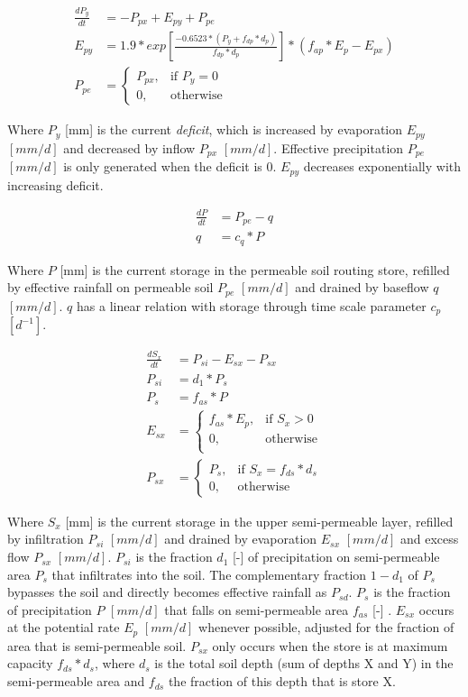 \begin{align}
	\frac{dP_y}{dt} &= -P_{px}+E_{py}+P_{pe} \\
	E_{py} &= 1.9*exp\left[{\frac{-0.6523*(P_y+f_{dp}*d_p)}{f_{dp}*d_p}}\right]*\left(f_{ap}*E_p - E_{px}\right)\\
	P_{pe} &= 
	\begin{cases}
		P_{px}, & \text{if } P_y = 0 \\
		0, & \text{otherwise}
	\end{cases}
\end{align}

Where $P_y$ [mm] is the current \emph{deficit}, which is increased by evaporation $E_{py}$ $[mm/d]$ and decreased by inflow $P_{px}$ $[mm/d]$.
Effective precipitation $P_{pe}$ $[mm/d]$ is only generated when the deficit is 0.
$E_{py}$ decreases exponentially with increasing deficit.

\begin{align}
	\frac{dP}{dt} &= P_{pe}-q \\
	q &= c_q*P
\end{align}

Where $P$ [mm] is the current storage in the permeable soil routing store, refilled by effective rainfall on permeable soil $P_{pe}$ $[mm/d]$ and drained by baseflow $q$ $[mm/d]$.
$q$ has a linear relation with storage through time scale parameter $c_p$ $[d^{-1}]$.

\begin{align}
	\frac{dS_x}{dt} &= P_{si}-E_{sx}-P_{sx} \\
	P_{si} &= d_1*P_s \\
	P_s &= f_{as}* P\\
	E_{sx} &= 
	\begin{cases}
		f_{as}*E_p, & \text{if } S_x > 0 \\
		0, & \text{otherwise}\\
	\end{cases}\\
	P_{sx} &= 
	\begin{cases}
		P_s, & \text{if } S_x = f_{ds}*d_s \\
		0, & \text{otherwise}
	\end{cases}
\end{align}

Where $S_x$ [mm] is the current storage in the upper semi-permeable layer, refilled by infiltration $P_{si}$ $[mm/d]$ and drained by evaporation $E_{sx}$ $[mm/d]$ and excess flow $P_{sx}$ $[mm/d]$.
$P_{si}$ is the fraction $d_1$ [-] of precipitation on semi-permeable area $P_s$ that infiltrates into the soil.
The complementary fraction $1-d_1$ of $P_s$ bypasses the soil and directly becomes effective rainfall as $P_{sd}$.
$P_s$ is the fraction of precipitation $P$ $[mm/d]$ that falls on semi-permeable area $f_{as}$ [-] .
$E_{sx}$ occurs at the potential rate $E_p$ $[mm/d]$ whenever possible, adjusted for the fraction of area that is semi-permeable soil.
$P_{sx}$ only occurs when the store is at maximum capacity $f_{ds}*d_s$, where $d_s$ is the total soil depth (sum of depths X and Y) in the semi-permeable area and $f_{ds}$ the fraction of this depth that is store X.

